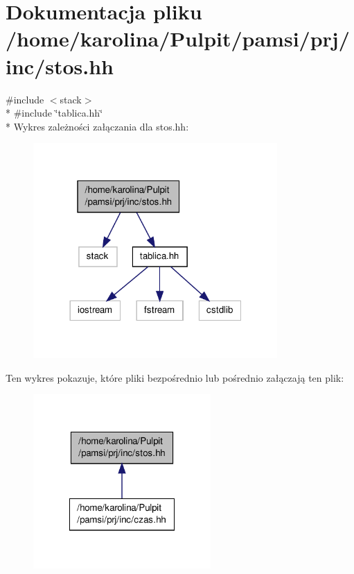 \hypertarget{stos_8hh}{\section{Dokumentacja pliku /home/karolina/\-Pulpit/pamsi/prj/inc/stos.hh}
\label{stos_8hh}
}
{\ttfamily \#include $<$stack$>$}\\*
{\ttfamily \#include \char`\"{}tablica.\-hh\char`\"{}}\\*
Wykres zależności załączania dla stos.\-hh\-:\nopagebreak
\begin{figure}[H]
\begin{center}
\leavevmode
\includegraphics[width=264pt]{stos_8hh__incl}
\end{center}
\end{figure}
Ten wykres pokazuje, które pliki bezpośrednio lub pośrednio załączają ten plik\-:
\nopagebreak
\begin{figure}[H]
\begin{center}
\leavevmode
\includegraphics[width=192pt]{stos_8hh__dep__incl}
\end{center}
\end{figure}
